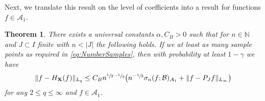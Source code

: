 \documentclass[11pt,reqno, a4paper]{article}
\numberwithin{equation}{section}
\newtheorem{theorem}{Theorem}[section]
\begin{document}
Next, we translate this result on the level of coefficients into a result for functions $f\in \mathcal A_1$.

\begin{theorem}\label{thm:Error_Recovery_Ops}
There exists a universal constants $\alpha, C_B>0$ such that for $n \in \mathbb{N}$ and $J\subset I$ finite with $n<\lvert J\rvert$ the following holds.
If we at least as many sample points  as required in \eqref{eq:NumberSamples}, then with probability at least $1-\gamma$ we have
\begin{gather}\label{eq:ErrorEstimateRIP}
	\lVert f - H_{\mathbf{X}}(f)\rVert_{L_q} \leq C_B n^{\sfrac{1}{2}-\sfrac{1}{q}}\big(n^{-\sfrac{1}{2}}\sigma_n(f;\mathcal{B})_{\mathcal{A}_1} + \lVert f-P_Jf\rVert_{L_\infty}\big)
\end{gather}
for any $2\leq q\leq \infty$ and $f \in \mathcal{A}_1$.
\end{theorem}
\end{document}
